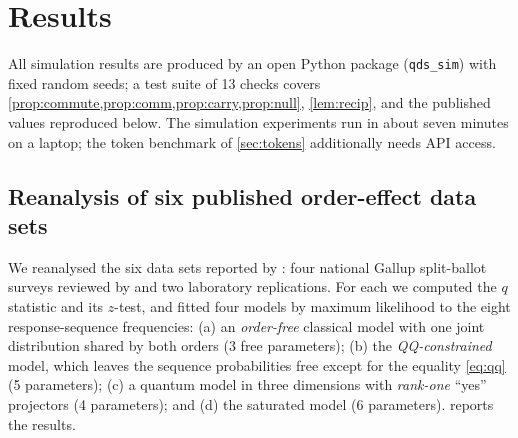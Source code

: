\documentclass[11pt]{article}
\theoremstyle{definition}
\theoremstyle{remark}
\begin{document}
\section{Results}
\label{sec:results}

All simulation results are produced by an open Python package (\texttt{qds\_sim}) with fixed random seeds; a test suite of 13 checks covers \cref{prop:commute,prop:comm,prop:carry,prop:null}, \cref{lem:recip}, and the published values reproduced below. The simulation experiments run in about seven minutes on a laptop; the token benchmark of \cref{sec:tokens} additionally needs API access.

\subsection{Reanalysis of six published order-effect data sets}
We reanalysed the six data sets reported by \citet{wang2013}: four national Gallup split-ballot surveys reviewed by \citet{moore2002} and two laboratory replications. For each we computed the $q$ statistic and its $z$-test, and fitted four models by maximum likelihood to the eight response-sequence frequencies: (a) an \emph{order-free} classical model with one joint distribution shared by both orders (3 free parameters); (b) the \emph{QQ-constrained} model, which leaves the sequence probabilities free except for the equality \eqref{eq:qq} (5 parameters); (c) a quantum model in three dimensions with \emph{rank-one} ``yes'' projectors (4 parameters); and (d) the saturated model (6 parameters).  reports the results.
\end{document}
